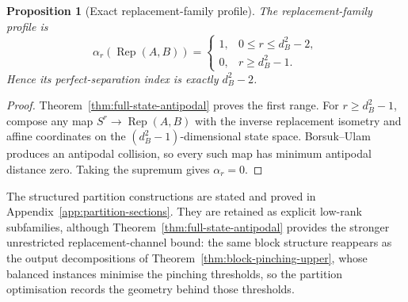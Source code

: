 \documentclass[11pt,a4paper]{article}
\theoremstyle{definition}
\theoremstyle{plain}
\newtheorem{proposition}[theorem]{Proposition}
\theoremstyle{remark}
\begin{document}
\begin{proposition}[Exact replacement-family profile]
\label{prop:replacement-perfect-index}
The replacement-family profile is
\[
\alpha_r(\operatorname{Rep}(A,B))
=
\begin{cases}
1,&0\leq r\leq d_B^2-2,\\
0,&r\geq d_B^2-1.
\end{cases}
\]
Hence its perfect-separation index is exactly $d_B^2-2$.
\end{proposition}

\begin{proof}
Theorem~\ref{thm:full-state-antipodal} proves the first range. For
$r\geq d_B^2-1$, compose any map
$S^r\to\operatorname{Rep}(A,B)$ with the inverse replacement isometry and
affine coordinates on the $(d_B^2-1)$-dimensional state space. Borsuk--Ulam
produces an antipodal collision, so every such map has minimum antipodal
distance zero. Taking the supremum gives $\alpha_r=0$.
\end{proof}

The structured partition constructions are stated and proved in
Appendix~\ref{app:partition-sections}. They are retained as explicit
low-rank subfamilies, although Theorem~\ref{thm:full-state-antipodal}
provides the stronger unrestricted replacement-channel bound: the same
block structure reappears as the output decompositions of
Theorem~\ref{thm:block-pinching-upper}, whose balanced instances minimise
the pinching thresholds, so the partition optimisation records the geometry
behind those thresholds.
\end{document}
